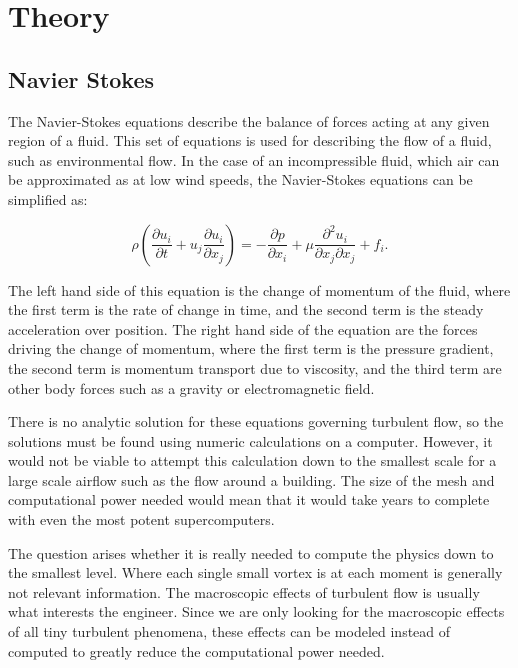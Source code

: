 \section{Theory}
\label{theory}

\subsection{Navier Stokes}

The Navier-Stokes equations describe the balance of forces acting at any given region of a fluid. This set of equations is used for describing the flow of a fluid, such as environmental flow. In the case of an incompressible fluid, which air can be approximated as at low wind speeds, the Navier-Stokes equations can be simplified as:


\begin{equation}\label{eq:NS}
\rho \left( \frac{\partial u_i}{\partial t} + u_j \frac{\partial u_i}{\partial x_j} \right) = -\frac{\partial p}{\partial x_i} + \mu \frac{\partial^2 u_i}{\partial x_j \partial x_j} + f_i. 
\end{equation} 

The left hand side of this equation is the change of momentum of the fluid, where the first term is the rate of change in time, and the second term is the steady acceleration over position. The right hand side of the equation are the forces driving the change of momentum, where the first term is the pressure gradient, the second term is momentum transport due to viscosity, and the third term are other body forces such as a gravity or electromagnetic field.

There is no analytic solution for these equations governing turbulent flow, so the solutions must be found using numeric calculations on a computer. However, it would not be viable to attempt this calculation down to the smallest scale for a large scale airflow such as the flow around a building. The size of the mesh and computational power needed would mean that it would take years to complete with even the most potent supercomputers. 

The question arises whether it is really needed to compute the physics down to the smallest level. Where each single small vortex is at each moment is generally not relevant information. The macroscopic effects of turbulent flow is usually what interests the engineer. Since we are only looking for the macroscopic effects of all tiny turbulent phenomena, these effects can be modeled instead of computed to greatly reduce the computational power needed. 

